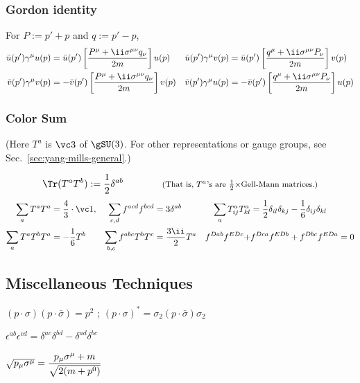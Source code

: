 \subsubsection{Gordon identity}
For  $P:=p'+p$ and $q:=p'-p$,
\begin{align}
 \bar u(p')\Gm u(p) &=  \bar u(p') \left[\frac{P^\mu + \ii\Smn q_\nu}{2m}\right] u(p)&
 \bar u(p')\Gm v(p) &=  \bar u(p') \left[\frac{q^\mu + \ii\Smn P_\nu}{2m}\right] v(p)\\
 \bar v(p')\Gm v(p) &= -\bar v(p') \left[\frac{P^\mu + \ii\Smn q_\nu}{2m}\right] v(p)&
 \bar v(p')\Gm u(p) &= -\bar v(p') \left[\frac{q^\mu + \ii\Smn P_\nu}{2m}\right] u(p)
\end{align}

\subsubsection{Color Sum}
\vspace{-20pt}
\begin{flushright}
{\footnotesize (Here $T^a$ is $\vc 3$ of $\gSU(3)$. For other representations or gauge groups, see Sec.~\ref{sec:yang-mills-general}.)}
\end{flushright}\vskip-10pt
\begin{equation}
  \Tr(T^aT^b):=\frac12\delta^{ab}\qquad\qquad \text{\footnotesize (That is, $T^a$'s are $\tfrac12\times$Gell-Mann matrices.)}
\end{equation}\vskip-20pt
\begin{align}
\sum_a T^aT^a    &= \frac43\cdot\vc 1, &
\sum_{c,d} f^{acd}f^{bcd} &= 3\delta^{ab}&
\sum_a T^a_{ij}T^a_{kl}   &= \frac12{\delta_{il}\delta_{kj}} - \frac16{\delta_{ij}\delta_{kl}}\\
\sum_a T^aT^bT^a &= -\frac16T^b &
\sum_{b,c} f^{abc}T^bT^c  &= \frac{3\ii}{2}T^a&
 f^{Dab}f^{EDc}+&f^{Dca}f^{EDb}+f^{Dbc}f^{EDa}=0
\end{align}

\vspace{50pt}


\subsection{Miscellaneous Techniques}
$(p\cdot\sigma)(p\cdot\bar\sigma)=p^2$
;\qquad
$(p\cdot\sigma)^* = \sigma_2(p\cdot\bar\sigma)\sigma_2$

$\epsilon^{ab}\epsilon^{cd}=\delta^{ac}\delta^{bd}-\delta^{ad}\delta^{bc}$

$\sqrt{p_\mu\sigma^\mu}=\dfrac{p_\mu\sigma^\mu+m}{\sqrt{2(m+p^0)}}$

